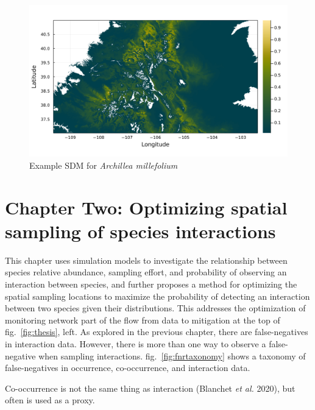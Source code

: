 \documentclass[10pt,oneside]{article}
\makeatletter
\def\maxwidth{\ifdim\Gin@nat@width>\linewidth\linewidth
\else\Gin@nat@width\fi}
\let\Oldincludegraphics\includegraphics
\renewcommand{\includegraphics}[1]{\Oldincludegraphics[width=\maxwidth]{#1}}
\makeatother
\begin{document}
\begin{figure}
\hypertarget{fig:example_sdm}{%
\centering
\includegraphics{./figures/sample_sdm.png}
\caption{Example SDM for \emph{Archillea
millefolium}}\label{fig:example_sdm}
}
\end{figure}

\hypertarget{chapter-two-optimizing-spatial-sampling-of-species-interactions}{%
\section{Chapter Two: Optimizing spatial sampling of species
interactions}\label{chapter-two-optimizing-spatial-sampling-of-species-interactions}}

This chapter uses simulation models to investigate the relationship
between species relative abundance, sampling effort, and probability of
observing an interaction between species, and further proposes a method
for optimizing the spatial sampling locations to maximize the
probability of detecting an interaction between two species given their
distributions. This addresses the optimization of monitoring network
part of the flow from data to mitigation at the top of
fig.~\ref{fig:thesis}, left. As explored in the previous chapter, there
are false-negatives in interaction data. However, there is more than one
way to observe a false-negative when sampling interactions.
fig.~\ref{fig:fnrtaxonomy} shows a taxonomy of false-negatives in
occurrence, co-occurrence, and interaction data.

Co-occurrence is not the same thing as interaction (Blanchet \emph{et
al.} 2020), but often is used as a proxy.
\end{document}
